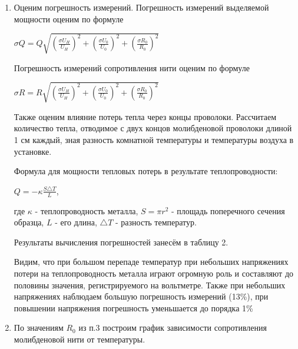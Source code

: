 \documentclass{article}
\begin{document}
\begin{enumerate}
     \item Оценим погрешность измерений. Погрешность измерений выделяемой мощности оценим по формуле
     \begin{center}
     $\sigma Q = Q\sqrt{(\frac{\sigma U_H}{U_H})^2+(\frac{\sigma U_0}{U_0})^2+(\frac{\sigma R_0}{R_0})^2}$
     \end{center} \par
     
     Погрешность измерений сопротивления нити оценим по формуле 
     \begin{center}
     $\sigma R = R\sqrt{(\frac{\sigma U_H}{U_H})^2+(\frac{\sigma U_0}{U_0})^2+(\frac{\sigma R_0}{R_0})^2}$
     \end{center} \par
     
     Также оценим влияние потерь тепла через концы проволоки. Рассчитаем количество тепла, отводимое с двух концов молибденовой проволоки длиной 1 см каждый, зная разность комнатной температуры и температуры воздуха в установке. \par
     Формула для мощности тепловых потерь в результате теплопроводности:
     \begin{center}
     $Q = - \kappa \frac{S \triangle T}{L}$,
     \end{center}
     где $\kappa$ - теплопроводность металла, $S = \pi r^2$ - площадь поперечного сечения образца, $L$ - его длина, $\triangle T$ - разность температур.
     
     Результаты вычисления погрешностей занесём в таблицу 2. 
     

    
    Видим, что при большом перепаде температур при небольших напряжениях потери на теплопроводность металла играют огромную роль и составляют до половины значения, регистрируемого на вольтметре. Также при небольших напряжениях наблюдаем большую погрешность измерений (13\%), при повышении напряжения погрешность уменьшается до порядка 1\%
    
    \item По значениям $R_0$ из п.3 построим график зависимости сопротивления молибденовой нити от температуры. 
    

\end{enumerate}
\end{document}
